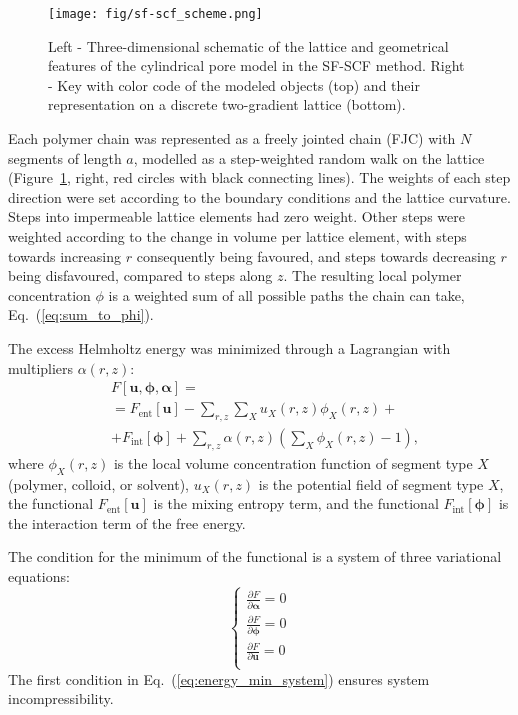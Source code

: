 \documentclass[10pt, a4paper]{article}
\begin{document}
\begin{multicols}{2}
\begin{figure}[H]
    \centering
    \texttt{[image: fig/sf-scf\_scheme.png]}
    \caption{
    Left - Three-dimensional schematic of the lattice and geometrical features of the cylindrical pore model in the SF-SCF method.
    Right - Key with color code of the modeled objects (top) and their representation on a discrete two-gradient lattice (bottom).
    }
    \label{fig:sf-scf_scheme}
\end{figure}

Each polymer chain was represented as a freely jointed chain (FJC) with $N$ segments of length $a$, modelled as a step-weighted random walk on the lattice (Figure~\ref{fig:sf-scf_scheme}, right, red circles with black connecting lines).
The weights of each step direction were set according to the boundary conditions and the lattice curvature.
Steps into impermeable lattice elements had zero weight.
Other steps were weighted according to the change in volume per lattice element, with steps towards increasing $r$ consequently being favoured, and steps towards decreasing $r$ being disfavoured, compared to steps along $z$.
The resulting local polymer concentration $\phi$ is a weighted sum of all possible paths the chain can take, Eq.~(\ref{eq:sum_to_phi}).

The excess Helmholtz energy was minimized through a Lagrangian with multipliers $\alpha(r,z)$:
\begin{equation}
    \label{eq:fe_lagrangian}
    \begin{aligned}
        &F[\bm{u}, \boldsymbol{\phi}, \boldsymbol{\alpha}] =\\
        &= F_{\text{ent}}[\bm{u}] - \sum\limits_{r,z} \sum\limits_X u_X(r, z) \phi_X(r, z) + \\
        &+ F_{\text{int}} [\boldsymbol{\phi}] 
        + \sum\limits_{r,z} \alpha(r, z) \left( \sum\limits_X \phi_X(r, z) - 1 \right),
    \end{aligned} 
\end{equation}
where $\phi_X(r,z)$ is the local volume concentration function of segment type $X$ (polymer, colloid, or solvent), $u_X(r, z)$ is the potential field of segment type $X$, the functional $F_{\text{ent}}[\bm{u}]$ is the mixing entropy term, and the functional $F_{\text{int}} [\boldsymbol{\phi}]$ is the interaction term of the free energy.

The condition for the minimum of the functional is a system of three variational equations:
\begin{equation}
    \label{eq:energy_min_system}
    \begin{cases}
        \frac{\partial F}{\partial \boldsymbol{\alpha}} = 0 \\
        \frac{\partial F}{\partial \boldsymbol{\phi}} = 0 \\
        \frac{\partial F}{\partial \bm{u}} = 0 \\
    \end{cases}
\end{equation}
The first condition in Eq.~(\ref{eq:energy_min_system}) ensures system incompressibility.


\end{multicols}
\end{document}
